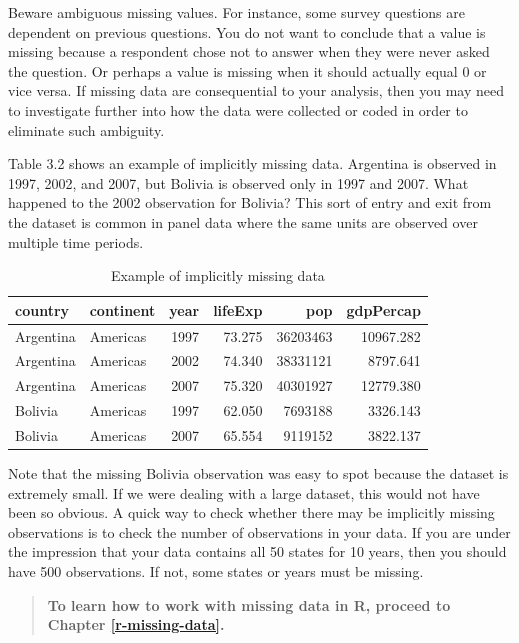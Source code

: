 \documentclass[
]{book}
\begin{document}
Beware ambiguous missing values. For instance, some survey questions are dependent on previous questions. You do not want to conclude that a value is missing because a respondent chose not to answer when they were never asked the question. Or perhaps a value is missing when it should actually equal 0 or vice versa. If missing data are consequential to your analysis, then you may need to investigate further into how the data were collected or coded in order to eliminate such ambiguity.

Table 3.2 shows an example of implicitly missing data. Argentina is observed in 1997, 2002, and 2007, but Bolivia is observed only in 1997 and 2007. What happened to the 2002 observation for Bolivia? This sort of entry and exit from the dataset is common in panel data where the same units are observed over multiple time periods.

\begin{table}

\caption{\label{tab:unnamed-chunk-2}Example of implicitly missing data}
\centering
\begin{tabular}[t]{l|l|r|r|r|r}
\hline
country & continent & year & lifeExp & pop & gdpPercap\\
\hline
Argentina & Americas & 1997 & 73.275 & 36203463 & 10967.282\\
\hline
Argentina & Americas & 2002 & 74.340 & 38331121 & 8797.641\\
\hline
Argentina & Americas & 2007 & 75.320 & 40301927 & 12779.380\\
\hline
Bolivia & Americas & 1997 & 62.050 & 7693188 & 3326.143\\
\hline
Bolivia & Americas & 2007 & 65.554 & 9119152 & 3822.137\\
\hline
\end{tabular}
\end{table}

Note that the missing Bolivia observation was easy to spot because the dataset is extremely small. If we were dealing with a large dataset, this would not have been so obvious. A quick way to check whether there may be implicitly missing observations is to check the number of observations in your data. If you are under the impression that your data contains all 50 states for 10 years, then you should have 500 observations. If not, some states or years must be missing.

\begin{quote}
\textbf{To learn how to work with missing data in R, proceed to Chapter \ref{r-missing-data}.}
\end{quote}
\end{document}
